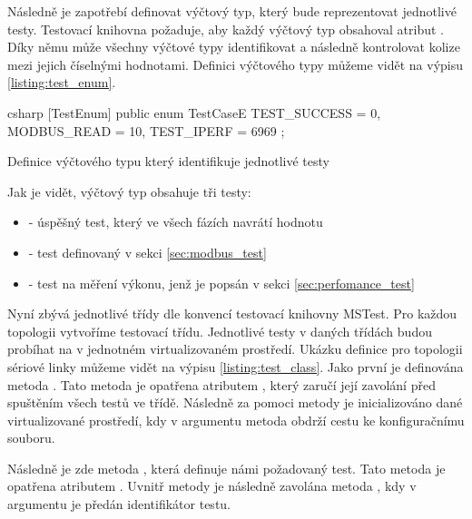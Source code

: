Následně je zapotřebí definovat výčtový typ, který bude reprezentovat jednotlivé testy. Testovací knihovna požaduje, aby každý výčtový typ obsahoval atribut . Díky němu může všechny výčtové typy identifikovat a následně kontrolovat kolize mezi jejich číselnými hodnotami. Definici výčtového typy můžeme vidět na výpisu \ref{listing:test_enum}. 

\begin{listing}[htbp]
    \centering
    \begin{cminted}[breaklines,autogobble, fontsize=\small]{csharp}
[TestEnum]
public enum TestCaseE
{
    TEST_SUCCESS = 0,
    MODBUS_READ = 10,
    TEST_IPERF = 6969
};
    \end{cminted}
\caption{Definice výčtového typu který identifikuje jednotlivé testy}
\label{listing:test_enum}
\end{listing}

Jak je vidět, výčtový typ obsahuje tři testy:

\begin{itemize}
    \item {} - úspěšný test, který ve všech fázích navrátí hodnotu 
    \item {} - test definovaný v sekci \ref{sec:modbus_test}
    \item {} - test na měření výkonu, jenž je popsán v sekci \ref{sec:perfomance_test}
\end{itemize}

Nyní zbývá jednotlivé třídy dle konvencí testovací knihovny MSTest. Pro každou topologii vytvoříme testovací třídu. Jednotlivé testy v daných třídách budou probíhat na v jednotném virtualizovaném prostředí. Ukázku definice pro topologii sériové linky můžeme vidět na výpisu \ref{listing:test_class}. Jako první je definována metoda . Tato metoda je opatřena atributem , který zaručí její zavolání před spuštěním všech testů ve třídě. Následně za pomoci metody  je inicializováno dané virtualizované prostředí, kdy v argumentu metoda obdrží cestu ke konfiguračnímu souboru.

Následně je zde metoda , která definuje námi požadovaný test. Tato metoda je opatřena atributem . Uvnitř metody je následně zavolána metoda , kdy v argumentu je předán identifikátor testu. 

